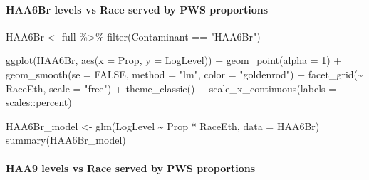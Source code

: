 \documentclass[
  letterpaper,
  DIV=11,
  numbers=noendperiod]{scrartcl}
\let\oldparagraph\paragraph
\renewcommand{\paragraph}[1]{\oldparagraph{#1}\mbox{}}
\newenvironment{Shaded}{\begin{snugshade}}{\end{snugshade}}
\newcommand{\AttributeTok}[1]{\textcolor[rgb]{0.40,0.45,0.13}{#1}}
\newcommand{\ConstantTok}[1]{\textcolor[rgb]{0.56,0.35,0.01}{#1}}
\newcommand{\DecValTok}[1]{\textcolor[rgb]{0.68,0.00,0.00}{#1}}
\newcommand{\FunctionTok}[1]{\textcolor[rgb]{0.28,0.35,0.67}{#1}}
\newcommand{\NormalTok}[1]{\textcolor[rgb]{0.00,0.23,0.31}{#1}}
\newcommand{\OtherTok}[1]{\textcolor[rgb]{0.00,0.23,0.31}{#1}}
\newcommand{\SpecialCharTok}[1]{\textcolor[rgb]{0.37,0.37,0.37}{#1}}
\newcommand{\StringTok}[1]{\textcolor[rgb]{0.13,0.47,0.30}{#1}}
\begin{document}
\hypertarget{haa6br-levels-vs-race-served-by-pws-proportions}{%
\paragraph{HAA6Br levels vs Race served by PWS
proportions}\label{haa6br-levels-vs-race-served-by-pws-proportions}}

\begin{Shaded}
\begin{Highlighting}[]
\NormalTok{HAA6Br }\OtherTok{\textless{}{-}}\NormalTok{ full }\SpecialCharTok{\%\textgreater{}\%} 
  \FunctionTok{filter}\NormalTok{(Contaminant }\SpecialCharTok{==} \StringTok{"HAA6Br"}\NormalTok{)}

\FunctionTok{ggplot}\NormalTok{(HAA6Br, }\FunctionTok{aes}\NormalTok{(}\AttributeTok{x =}\NormalTok{ Prop, }\AttributeTok{y =}\NormalTok{ LogLevel)) }\SpecialCharTok{+}
  \FunctionTok{geom\_point}\NormalTok{(}\AttributeTok{alpha =} \DecValTok{1}\NormalTok{) }\SpecialCharTok{+}
  \FunctionTok{geom\_smooth}\NormalTok{(}\AttributeTok{se =} \ConstantTok{FALSE}\NormalTok{, }\AttributeTok{method =} \StringTok{"lm"}\NormalTok{, }\AttributeTok{color =} \StringTok{"goldenrod"}\NormalTok{) }\SpecialCharTok{+}
  \FunctionTok{facet\_grid}\NormalTok{(}\SpecialCharTok{\textasciitilde{}}\NormalTok{ RaceEth, }\AttributeTok{scale =} \StringTok{"free"}\NormalTok{) }\SpecialCharTok{+}
  \FunctionTok{theme\_classic}\NormalTok{() }\SpecialCharTok{+}
  \FunctionTok{scale\_x\_continuous}\NormalTok{(}\AttributeTok{labels =}\NormalTok{ scales}\SpecialCharTok{::}\NormalTok{percent)}

\NormalTok{HAA6Br\_model }\OtherTok{\textless{}{-}} \FunctionTok{glm}\NormalTok{(LogLevel }\SpecialCharTok{\textasciitilde{}}\NormalTok{ Prop }\SpecialCharTok{*}\NormalTok{ RaceEth, }\AttributeTok{data =}\NormalTok{ HAA6Br)}
\FunctionTok{summary}\NormalTok{(HAA6Br\_model)}
\end{Highlighting}
\end{Shaded}

\hypertarget{haa9-levels-vs-race-served-by-pws-proportions}{%
\paragraph{HAA9 levels vs Race served by PWS
proportions}\label{haa9-levels-vs-race-served-by-pws-proportions}}
\end{document}
